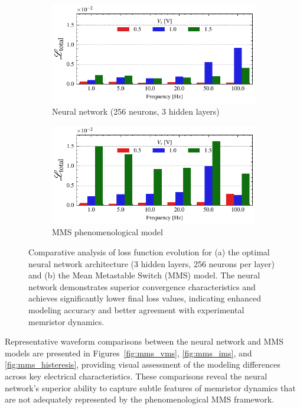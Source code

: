 \documentclass[11pt, oneside]{article}
\begin{document}
\begin{figure}[htbp!]
    \begin{subfigure}[c]{0.48\linewidth}
        \centering
        \includegraphics[width=\linewidth]{mms_results/loss_per_freq_256 neurons, 3 layers.pdf}
        \caption{Neural network (256 neurons, 3 hidden layers)}
    \end{subfigure}
    \begin{subfigure}[c]{0.48\linewidth}
        \centering
        \includegraphics[width=\linewidth]{mms_results/loss_per_freq_MMS Model.pdf}
        \caption{MMS phenomenological model}
    \end{subfigure}
    \caption{Comparative analysis of loss function evolution for (a) the optimal neural network architecture (3 hidden layers, 256 neurons per layer) and (b) the Mean Metastable Switch (MMS) model. The neural network demonstrates superior convergence characteristics and achieves significantly lower final loss values, indicating enhanced modeling accuracy and better agreement with experimental memristor dynamics.}
    \label{fig:comparison_mms}
\end{figure}

Representative waveform comparisons between the neural network and MMS models are presented in Figures~\ref{fig:mms_vms}, \ref{fig:mms_ims}, and \ref{fig:mms_histeresis}, providing visual assessment of the modeling differences across key electrical characteristics. These comparisons reveal the neural network's superior ability to capture subtle features of memristor dynamics that are not adequately represented by the phenomenological MMS framework.
\end{document}

